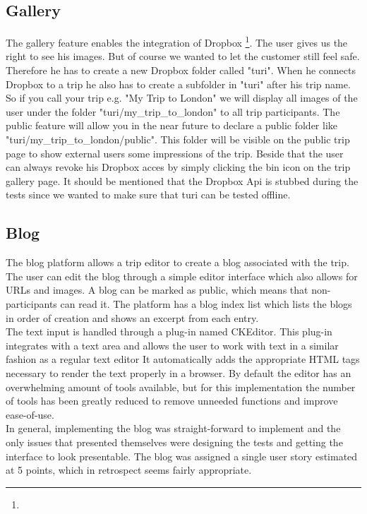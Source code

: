 \documentclass[a4paper]{article}
\begin{document}
\subsection{Gallery}
The gallery feature enables the integration of Dropbox \footnote{\DROPBOX}. The user gives us the right to see his images. But of course we wanted to let the customer still feel safe. Therefore he has to create a new Dropbox folder called "turi". When he connects Dropbox to a trip he also has to create a subfolder in "turi" after his trip name. So if you call your trip e.g. "My Trip to London" we will display all images of the user under the folder "turi/my\_trip\_to\_london" to all trip participants. The public feature will allow you in the near future to declare a public folder like "turi/my\_trip\_to\_london/public". This folder will be visible on the public trip page to show external users some impressions of the trip. Beside that the user can always revoke his Dropbox acces by simply clicking the bin icon on the trip gallery page. It should be mentioned that the Dropbox Api is stubbed during the tests since we wanted to make sure that turi can be tested offline.

\subsection{Blog}
The blog platform allows a trip editor to create a blog associated with the trip. The user can edit the blog through a simple editor interface which also allows for URLs and images. A blog can be marked as public, which means that non-participants can read it. The platform has a blog index list which lists the blogs in order of creation and shows an excerpt from each entry.\\

\noindent
The text input is handled through a plug-in named CKEditor\cite{ckeditor}. This plug-in integrates with a text area and allows the user to work with text in a similar fashion as a regular text editor It automatically adds the appropriate HTML tags necessary to render the text properly in a browser. By default the editor has an overwhelming amount of tools available, but for this implementation the number of tools has been greatly reduced to remove unneeded functions and improve ease-of-use.\\

\noindent
In general, implementing the blog was straight-forward to implement and the only issues that presented themselves were designing the tests and getting the interface to look presentable. The blog was assigned a single user story estimated at 5 points, which in retrospect seems fairly appropriate.
\end{document}
